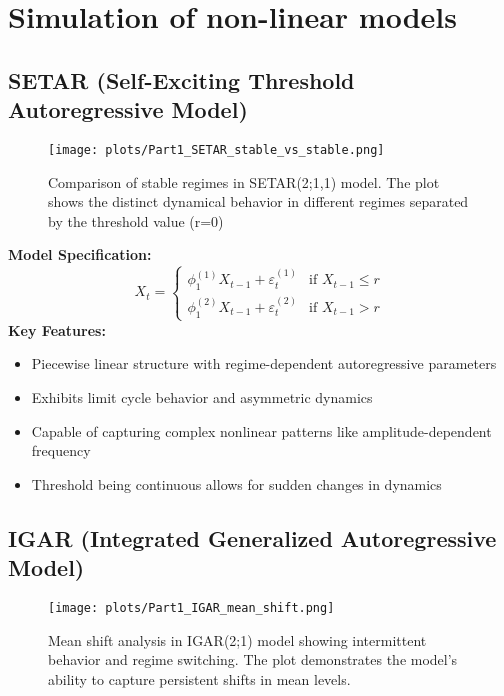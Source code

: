 \documentclass{article}
\begin{document}


\tableofcontents
\newpage

\section{Simulation of non-linear models}

\subsection{SETAR (Self-Exciting Threshold Autoregressive Model)}
\begin{figure}[H]
\centering
\texttt{[image: plots/Part1\_SETAR\_stable\_vs\_stable.png]}
\caption{Comparison of stable regimes in SETAR(2;1,1) model. The plot shows the distinct dynamical behavior in different regimes separated by the threshold value (r=0)}
\label{fig:setar_stable}
\end{figure}

\textbf{Model Specification:}
\[
X_t = 
\begin{cases}
\phi_1^{(1)} X_{t-1} + \varepsilon_t^{(1)} & \text{if } X_{t-1} \leq r \\
\phi_1^{(2)} X_{t-1} + \varepsilon_t^{(2)} & \text{if } X_{t-1} > r
\end{cases}
\]
\textbf{Key Features:}
\begin{itemize}
\item Piecewise linear structure with regime-dependent autoregressive parameters
\item Exhibits limit cycle behavior and asymmetric dynamics
\item Capable of capturing complex nonlinear patterns like amplitude-dependent frequency
\item Threshold being continuous allows for sudden changes in dynamics
\end{itemize}

\subsection{IGAR (Integrated Generalized Autoregressive Model)}
\begin{figure}[H]
\centering
\texttt{[image: plots/Part1\_IGAR\_mean\_shift.png]}
\caption{Mean shift analysis in IGAR(2;1) model showing intermittent behavior and regime switching. The plot demonstrates the model's ability to capture persistent shifts in mean levels.}
\label{fig:igar_mean_shift}
\end{figure}
\end{document}
